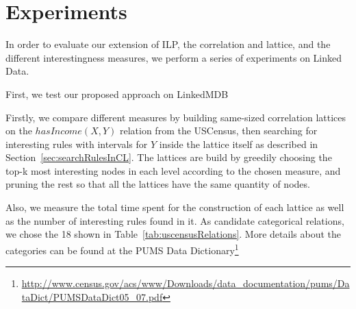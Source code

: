 \chapter{Experiments}
\label{ch:intro}

In order to evaluate our extension of ILP, the correlation and lattice, and the different interestingness measures, we
perform a series of experiments on Linked Data.

First, we test our proposed approach on LinkedMDB 

Firstly, we compare different measures by building same-sized correlation lattices on the $hasIncome(X,Y)$
relation from the USCensus, then searching for interesting rules with intervals for $Y$ inside the lattice itself as
described in Section~\ref{sec:searchRulesInCL}. The lattices are build by greedily choosing the top-k most interesting
nodes in each level according to the chosen measure, and pruning the rest so that all the lattices have the same
quantity of nodes.

Also, we measure the total time spent for the construction of each lattice as well as the number of interesting rules
found in it. As candidate categorical relations, we chose the 18 shown in Table~\ref{tab:uscensusRelations}. More
details about the categories can be found at the PUMS
Data
Dictionary\footnote{\url{http://www.census.gov/acs/www/Downloads/data_documentation/pums/DataDict/PUMSDataDict05_07.pdf}
}

